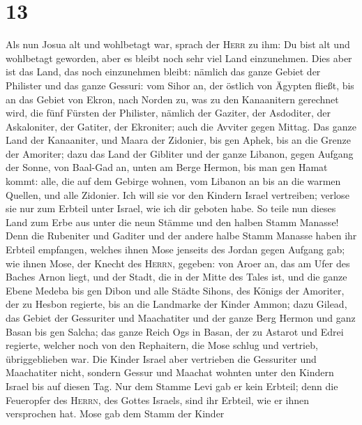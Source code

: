 \hypertarget{section-12}{%
\section{13}\label{section-12}}

 Als nun Josua alt und wohlbetagt war, sprach der
\textsc{Herr} zu ihm: Du bist alt und wohlbetagt geworden, aber es
bleibt noch sehr viel Land einzunehmen.  Dies aber ist das
Land, das noch einzunehmen bleibt: nämlich das ganze Gebiet der
Philister und das ganze Gessuri:  vom Sihor an, der
östlich von Ägypten fließt, bis an das Gebiet von Ekron, nach Norden zu,
was zu den Kanaanitern gerechnet wird, die fünf Fürsten der Philister,
nämlich der Gaziter, der Asdoditer, der Askaloniter, der Gatiter, der
Ekroniter; auch die Avviter gegen Mittag.  Das ganze Land
der Kanaaniter, und Maara der Zidonier, bis gen Aphek, bis an die Grenze
der Amoriter;  dazu das Land der Gibliter und der ganze
Libanon, gegen Aufgang der Sonne, von Baal-Gad an, unten am Berge
Hermon, bis man gen Hamat kommt:  alle, die auf dem
Gebirge wohnen, vom Libanon an bis an die warmen Quellen, und alle
Zidonier. Ich will sie vor den Kindern Israel vertreiben; verlose sie
nur zum Erbteil unter Israel, wie ich dir geboten habe. 
So teile nun dieses Land zum Erbe aus unter die neun Stämme und den
halben Stamm Manasse!  Denn die Rubeniter und Gaditer und
der andere halbe Stamm Manasse haben ihr Erbteil empfangen, welches
ihnen Mose jenseits des Jordan gegen Aufgang gab; wie ihnen Mose, der
Knecht des \textsc{Herrn}, gegeben:  von Aroer an, das am
Ufer des Baches Arnon liegt, und der Stadt, die in der Mitte des Tales
ist, und die ganze Ebene Medeba  bis gen Dibon und alle
Städte Sihons, des Königs der Amoriter, der zu Hesbon regierte, bis an
die Landmarke der Kinder Ammon;  dazu Gilead, das Gebiet
der Gessuriter und Maachatiter und der ganze Berg Hermon und ganz Basan
bis gen Salcha;  das ganze Reich Ogs in Basan, der zu
Astarot und Edrei regierte, welcher noch von den Rephaitern, die Mose
schlug und vertrieb, übriggeblieben war.  Die Kinder
Israel aber vertrieben die Gessuriter und Maachatiter nicht, sondern
Gessur und Maachat wohnten unter den Kindern Israel bis auf diesen Tag.
 Nur dem Stamme Levi gab er kein Erbteil; denn die
Feueropfer des \textsc{Herrn}, des Gottes Israels, sind ihr Erbteil, wie
er ihnen versprochen hat.  Mose gab dem Stamm der Kinder
